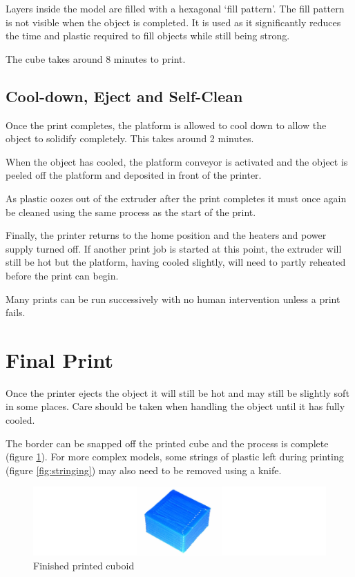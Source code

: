 			Layers inside the model are filled with a hexagonal `fill pattern'. The
			fill pattern is not visible when the object is completed. It is used as it
			significantly reduces the time and plastic required to fill objects while
			still being strong.
			
			
			The cube takes around 8 minutes to print.
		
		\subsection{Cool-down, Eject and Self-Clean}
			
			Once the print completes, the platform is allowed to cool down to allow
			the object to solidify completely. This takes around 2 minutes.
			
			When the object has cooled, the platform conveyor is activated and the
			object is peeled off the platform and deposited in front of the printer.
			
			
			As plastic oozes out of the extruder after the print completes it must
			once again be cleaned using the same process as the start of the print.
			
			Finally, the printer returns to the home position and the heaters and
			power supply turned off. If another print job is started at this point,
			the extruder will still be hot but the platform, having cooled slightly,
			will need to partly reheated before the print can begin.
			
			Many prints can be run successively with no human intervention unless a
			print fails.
			
		
	\section{Final Print}
		
		Once the printer ejects the object it will still be hot and may still be
		slightly soft in some places. Care should be taken when handling the object
		until it has fully cooled.
		
		The border can be snapped off the printed cube and the process is complete
		(figure \ref{fig:exampleCube}). For more complex models, some strings of
		plastic left during printing (figure \ref{fig:stringing}) may also need to
		be removed using a knife.
		
		\begin{figure}
			\includegraphics[width=1\textwidth]{diagrams/exampleCube.pdf}
			\caption{Finished printed cuboid}
			\label{fig:exampleCube}
		\end{figure}
		
